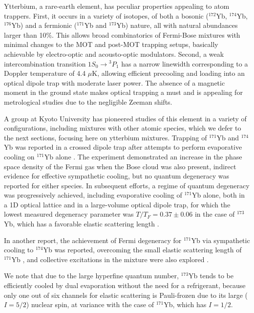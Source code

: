 \documentclass[pra,letterpaper,twocolumn,showpacs,superscriptaddress]{revtex4}
\begin{document}
Ytterbium, a rare-earth element, has peculiar properties appealing to atom trappers. First, it occurs in a variety of isotopes, of both a  bosonic 
(${}^{172}$Yb, ${}^{174}$Yb, ${}^{176}$Yb) and a fermionic (${}^{171}$Yb and ${}^{173}$Yb) nature, all with natural abundances 
larger than 10$\%$. This allows broad combinatorics of Fermi-Bose mixtures with minimal changes to the MOT and post-MOT 
trapping setups, basically achievable by electro-optic and acousto-optic modulators. Second, a weak intercombination transition 
$1S_0 \rightarrow {}^3P_1$ has a narrow linewidth corresponding to a Doppler temperature of 4.4 $\mu$K, allowing 
efficient precooling and loading into an optical dipole trap with moderate laser power. The absence of a magnetic moment 
in the ground state makes optical trapping a must and is appealing for metrological studies due to the negligible Zeeman shifts. 

A group at Kyoto University has pioneered studies of this element in a variety of configurations, including mixtures with other atomic species, which we 
defer to the next sections, focusing here on ytterbium mixtures. Trapping of ${}^{171}$Yb and ${}^{174}$Yb was reported in a crossed dipole 
trap after attempts to perform evaporative cooling on ${}^{171}$Yb alone \cite{Honda2002}. 
The experiment demonstrated an increase in the phase space density of the Fermi gas when the Bose cloud was also present, indirect 
evidence for effective sympathetic cooling, but no quantum degeneracy was reported for either species. 
In subsequent efforts, a regime of quantum degeneracy was progressively achieved, including evaporative cooling of ${}^{171}$Yb alone, 
both in a 1D optical lattice and in a large-volume optical dipole trap, for which the lowest measured degeneracy parameter was $T/T_F=0.37 \pm 0.06$ 
in the case of ${}^{173}$Yb, which has a favorable elastic scattering length \cite{Takasu2006,Fukuhara2007a}. 

In another report, the achievement of Fermi degeneracy for ${}^{171}$Yb via sympathetic cooling to ${}^{174}$Yb was 
reported, overcoming the small elastic scattering length of ${}^{171}$Yb \cite{Fukuhara2007b,Fukuhara2009a}, and 
collective excitations in the mixture were also explored \cite{Fukuhara2009b}. 

We note that due to the large hyperfine quantum number, ${}^{173}$Yb tends to be efficiently cooled by dual evaporation without the need for a refrigerant, because 
only one out of six channels for elastic scattering is Pauli-frozen due to its large ($I=5/2$) nuclear spin, at variance with the case of ${}^{171}$Yb, which has $I=1/2$.
 
\end{document}
